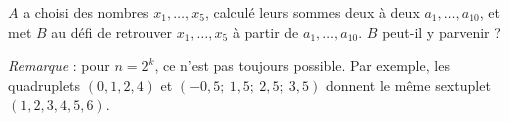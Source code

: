 $A$ a choisi des nombres $x_1, \ldots, x_5$, calculé leurs sommes deux à deux $a_1, \ldots, a_{10}$, et met $B$ au défi de retrouver $x_1, \ldots, x_5$ à partir de $a_1, \ldots, a_{10}$. $B$ peut-il y parvenir ?

\emph{Remarque} : pour $n = 2^k$, ce n'est pas toujours possible. Par exemple, les quadruplets $(0, 1, 2, 4)$ et $(-0{,}5;\ 1{,}5;\ 2{,}5;\ 3{,}5)$ donnent le même sextuplet $(1, 2, 3, 4, 5, 6)$.
